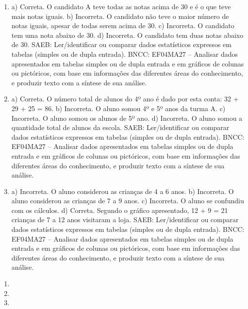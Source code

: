 \begin{enumerate}
\item
a) Correta. O candidato A teve todas as notas acima de 30 e é o que teve mais notas iguais.
b) Incorreta. O candidato não teve o maior número de notas iguais, apesar de todas serem acima de 30.
c) Incorreta. O candidato tem uma nota abaixo de 30.
d) Incorreta. O candidato tem duas notas abaixo de 30.
SAEB: Ler/identificar ou comparar dados estatísticos expressos em tabelas (simples ou de dupla entrada).
BNCC: EF04MA27 -- Analisar dados apresentados em tabelas simples ou de dupla entrada e em gráficos de
colunas ou pictóricos, com base em informações das diferentes áreas do conhecimento, e produzir
texto com a síntese de sua análise.

\item
a)  Correta. O número total de alunos do 4º ano é dado por esta conta: 32 + 29 + 25 = 86.
b)  Incorreta. O aluno somou 4º e 5º anos da turma A.
c)  Incorreta. O aluno somou os alunos de 5º ano.
d)  Incorreta. O aluno somou a quantidade total de alunos da escola.
SAEB: Ler/identificar ou comparar dados estatísticos expressos em tabelas (simples ou de dupla entrada).
BNCC: EF04MA27 -- Analisar dados apresentados em tabelas simples ou de dupla entrada e em gráficos de
colunas ou pictóricos, com base em informações das diferentes áreas do conhecimento, e produzir
texto com a síntese de sua análise.

\item
a)  Incorreta. O aluno considerou as crianças de 4 a 6 anos.
b)  Incorreta. O aluno considerou as crianças de 7 a 9 anos.
c)  Incorreta. O aluno se confundiu com os cálculos.
d)  Correta. Segundo o gráfico apresentado, 12 + 9 = 21 crianças de 7 a 12 anos visitaram a loja.
SAEB: Ler/identificar ou comparar dados estatísticos expressos em tabelas (simples ou de dupla entrada).
BNCC: EF04MA27 -- Analisar dados apresentados em tabelas simples ou de dupla entrada e em gráficos de
colunas ou pictóricos, com base em informações das diferentes áreas do conhecimento, e produzir
texto com a síntese de sua análise.
\end{enumerate}


\begin{enumerate}
\item

\item

\item
\end{enumerate}


